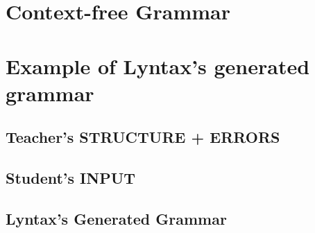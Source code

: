 \chapter{Context-free Grammar}



\chapter{Example of Lyntax's generated grammar}

\section{Teacher's STRUCTURE + ERRORS}


\newpage
\section{Student's INPUT}


\section{Lyntax's Generated Grammar}
